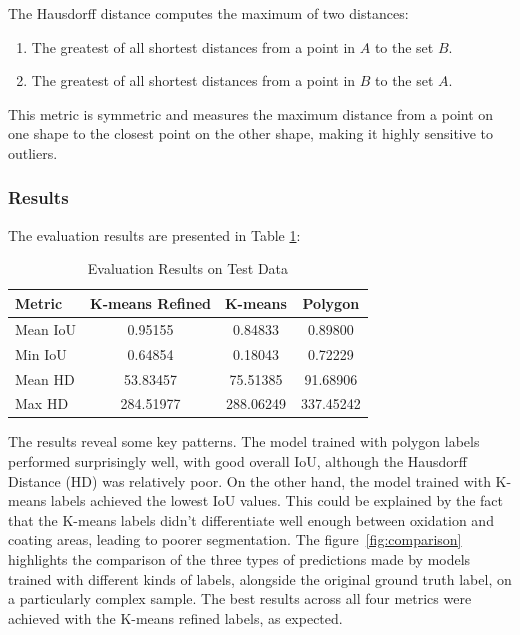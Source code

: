 The Hausdorff distance computes the maximum of two distances:
\begin{enumerate}
    \item The greatest of all shortest distances from a point in \( A \) to the set \( B \).
    \item The greatest of all shortest distances from a point in \( B \) to the set \( A \).
\end{enumerate}



This metric is symmetric and measures the maximum distance from a point on one shape to the closest point on the other shape, making it highly sensitive to outliers. 

\subsubsection{Results}
The evaluation results are presented in Table \ref{tab:test_results}:

\begin{table}[H]
    \centering
    \caption{Evaluation Results on Test Data}
    \renewcommand{\arraystretch}{1.2}
    
    \begin{tabular}{lccc}
        \toprule
        \textbf{Metric} & \textbf{K-means Refined} & \textbf{K-means} & \textbf{Polygon} \\
        \midrule
        Mean IoU & 0.95155 & 0.84833 & 0.89800 \\
        Min IoU  & 0.64854 & 0.18043 & 0.72229 \\
        Mean HD  & 53.83457 & 75.51385 & 91.68906 \\
        Max HD  & 284.51977 & 288.06249 & 337.45242 \\
        \bottomrule
    \end{tabular}
    \label{tab:test_results}
\end{table}


The results reveal some key patterns. The model trained with polygon labels performed surprisingly well, with good overall IoU, although the Hausdorff Distance (HD) was relatively poor. On the other hand, the model trained with K-means labels achieved the lowest IoU values. This could be explained by the fact that the K-means labels didn't differentiate well enough between oxidation and coating areas, leading to poorer segmentation. The figure~\ref{fig:comparison} highlights the comparison of the three types of predictions made by models trained with different kinds of labels, alongside the original ground truth label, on a particularly complex sample. The best results across all four metrics were achieved with the K-means refined labels, as expected.


